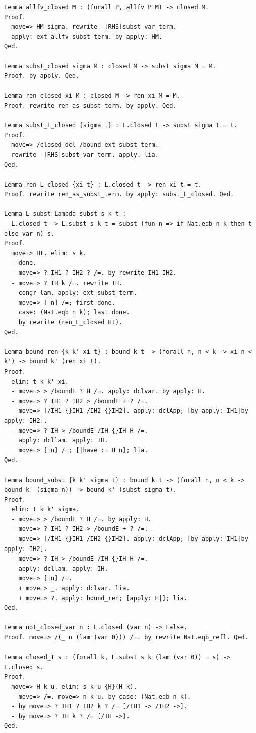 \documentclass[10pt,a4paper]{amsart}
\begin{document}
\begin{lstlisting}
Lemma allfv_closed M : (forall P, allfv P M) -> closed M.
Proof.
  move=> HM sigma. rewrite -[RHS]subst_var_term.
  apply: ext_allfv_subst_term. by apply: HM.
Qed.

Lemma subst_closed sigma M : closed M -> subst sigma M = M.
Proof. by apply. Qed.

Lemma ren_closed xi M : closed M -> ren xi M = M.
Proof. rewrite ren_as_subst_term. by apply. Qed.

Lemma subst_L_closed {sigma t} : L.closed t -> subst sigma t = t.
Proof.
  move=> /closed_dcl /bound_ext_subst_term.
  rewrite -[RHS]subst_var_term. apply. lia.
Qed.

Lemma ren_L_closed {xi t} : L.closed t -> ren xi t = t.
Proof. rewrite ren_as_subst_term. by apply: subst_L_closed. Qed.

Lemma L_subst_Lambda_subst s k t :
  L.closed t -> L.subst s k t = subst (fun n => if Nat.eqb n k then t else var n) s.
Proof.
  move=> Ht. elim: s k.
  - done. 
  - move=> ? IH1 ? IH2 ? /=. by rewrite IH1 IH2.
  - move=> ? IH k /=. rewrite IH.
    congr lam. apply: ext_subst_term.
    move=> [|n] /=; first done.
    case: (Nat.eqb n k); last done.
    by rewrite (ren_L_closed Ht).
Qed.

Lemma bound_ren {k k' xi t} : bound k t -> (forall n, n < k -> xi n < k') -> bound k' (ren xi t).
Proof.
  elim: t k k' xi.
  - move=> > /boundE ? H /=. apply: dclvar. by apply: H.
  - move=> ? IH1 ? IH2 > /boundE + ? /=.
    move=> [/IH1 {}IH1 /IH2 {}IH2]. apply: dclApp; [by apply: IH1|by apply: IH2].
  - move=> ? IH > /boundE /IH {}IH H /=.
    apply: dcllam. apply: IH.
    move=> [|n] /=; [|have := H n]; lia.
Qed.

Lemma bound_subst {k k' sigma t} : bound k t -> (forall n, n < k -> bound k' (sigma n)) -> bound k' (subst sigma t).
Proof.
  elim: t k k' sigma.
  - move=> > /boundE ? H /=. by apply: H.
  - move=> ? IH1 ? IH2 > /boundE + ? /=.
    move=> [/IH1 {}IH1 /IH2 {}IH2]. apply: dclApp; [by apply: IH1|by apply: IH2].
  - move=> ? IH > /boundE /IH {}IH H /=.
    apply: dcllam. apply: IH.
    move=> [|n] /=.
    + move=> _. apply: dclvar. lia.
    + move=> ?. apply: bound_ren; [apply: H|]; lia.
Qed.

Lemma not_closed_var n : L.closed (var n) -> False.
Proof. move=> /(_ n (lam (var 0))) /=. by rewrite Nat.eqb_refl. Qed.

Lemma closed_I s : (forall k, L.subst s k (lam (var 0)) = s) -> L.closed s.
Proof.
  move=> H k u. elim: s k u {H}(H k).
  - move=> /=. move=> n k u. by case: (Nat.eqb n k).
  - by move=> ? IH1 ? IH2 k ? /= [/IH1 -> /IH2 ->].
  - by move=> ? IH k ? /= [/IH ->].
Qed.


\end{lstlisting}
\end{document}
